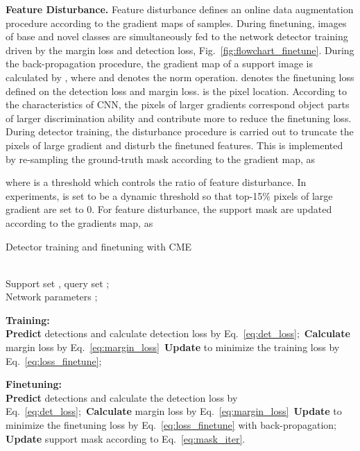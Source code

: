 \documentclass[final]{cvpr}
\begin{document}
\textbf{Feature Disturbance.}
Feature disturbance defines an online data augmentation procedure according to the gradient maps of samples. During finetuning, images of base and novel classes are simultaneously fed to the network detector training driven by the margin loss and detection loss, Fig.\ \ref{fig:flowchart_finetune}. During the back-propagation procedure, the gradient map of a support image is calculated by , where  and  denotes the norm operation.  denotes the finetuning loss defined on the detection loss and margin loss.  is the pixel location. According to the characteristics of CNN, the pixels of larger gradients correspond object parts of larger discrimination ability and contribute more to reduce the finetuning loss. During detector training, the disturbance procedure is carried out to truncate the pixels of large gradient and disturb the finetuned features. This is implemented by re-sampling the ground-truth mask according to the gradient map, as 

where  is a threshold which controls the ratio of feature disturbance. In experiments,  is set to be a dynamic threshold so that top-15\% pixels of large gradient are set to 0. For feature disturbance, the support mask  are updated according to the gradients map, as




\begin{algorithm}[t]
\label{alg:onlineEM}
\caption{Detector training and finetuning with CME}
\renewcommand{\algorithmicrequire}{\textbf{Input:}}  
\renewcommand{\algorithmicensure}{\textbf{Output:}}  
\begin{algorithmic}
\REQUIRE ~~\\ Support set , query set ;
\ENSURE ~~\\ Network parameters ;

\textbf{Training:}\\
\STATE \textbf{Predict} detections and calculate detection loss  by Eq.\ \ref{eq:det_loss};\
\STATE \textbf{Calculate} margin loss  by Eq.\ \ref{eq:margin_loss}\
\STATE \textbf{Update}  to minimize the training loss  by Eq.\ \ref{eq:loss_finetune};
\ENDFOR

\textbf{Finetuning:}\\
\STATE \textbf{Predict} detections and calculate the detection loss  by Eq.~\ref{eq:det_loss};\
\STATE \textbf{Calculate} margin loss  by Eq.\ \ref{eq:margin_loss}\
\STATE \textbf{Update}  to minimize the finetuning loss  by Eq.\ \ref{eq:loss_finetune} with back-propagation;
\STATE \textbf{Update} support mask  according to Eq.\ \ref{eq:mask_iter}.\
\ENDFOR
\ENDFOR

\end{algorithmic}
\end{algorithm}
\end{document}
